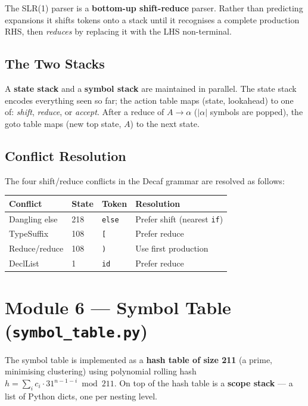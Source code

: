 \documentclass[12pt,a4paper]{article}
\begin{document}
The SLR(1) parser is a \textbf{bottom-up shift-reduce} parser. Rather than
predicting expansions it shifts tokens onto a stack until it recognises a complete
production RHS, then \emph{reduces} by replacing it with the LHS non-terminal.

\subsection*{The Two Stacks}
A \textbf{state stack} and a \textbf{symbol stack} are maintained in parallel.
The state stack encodes everything seen so far; the action table maps
(state, lookahead) to one of: \emph{shift}, \emph{reduce}, or \emph{accept}.
After a reduce of $A \to \alpha$ ($|\alpha|$ symbols are popped), the goto table
maps (new top state, $A$) to the next state.

\subsection*{Conflict Resolution}
The four shift/reduce conflicts in the Decaf grammar are resolved as follows:

\begin{center}
\begin{tabular}{llll}
\toprule
\textbf{Conflict} & \textbf{State} & \textbf{Token} & \textbf{Resolution} \\
\midrule
Dangling else    & 218 & \texttt{else} & Prefer shift (nearest \texttt{if}) \\
TypeSuffix       & 108 & \texttt{[}    & Prefer reduce \\
Reduce/reduce    & 108 & \texttt{)}    & Use first production \\
DeclList         & 1   & \texttt{id}   & Prefer reduce \\
\bottomrule
\end{tabular}
\end{center}

\section{Module 6 — Symbol Table (\texttt{symbol\_table.py})}

The symbol table is implemented as a \textbf{hash table of size 211} (a prime,
minimising clustering) using polynomial rolling hash
$h = \sum_i c_i \cdot 31^{n-1-i} \bmod 211$.
On top of the hash table is a \textbf{scope stack} — a list of Python dicts, one
per nesting level.
\end{document}
